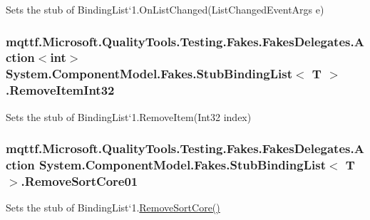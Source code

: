 Sets the stub of Binding\-List`1.On\-List\-Changed(\-List\-Changed\-Event\-Args e)

\hypertarget{class_system_1_1_component_model_1_1_fakes_1_1_stub_binding_list_3_01_t_01_4_a0ae4ea514a744ba36f4db9aa710d0f51}{
\subsubsection[{Remove\-Item\-Int32}]{\setlength{\rightskip}{0pt plus 5cm}mqttf.\-Microsoft.\-Quality\-Tools.\-Testing.\-Fakes.\-Fakes\-Delegates.\-Action$<$int$>$ System.\-Component\-Model.\-Fakes.\-Stub\-Binding\-List$<$ T $>$.Remove\-Item\-Int32}}\label{class_system_1_1_component_model_1_1_fakes_1_1_stub_binding_list_3_01_t_01_4_a0ae4ea514a744ba36f4db9aa710d0f51}


Sets the stub of Binding\-List`1.Remove\-Item(\-Int32 index)

\hypertarget{class_system_1_1_component_model_1_1_fakes_1_1_stub_binding_list_3_01_t_01_4_a65b7586153f60a39a54251416e7b1cf1}{
\subsubsection[{Remove\-Sort\-Core01}]{\setlength{\rightskip}{0pt plus 5cm}mqttf.\-Microsoft.\-Quality\-Tools.\-Testing.\-Fakes.\-Fakes\-Delegates.\-Action System.\-Component\-Model.\-Fakes.\-Stub\-Binding\-List$<$ T $>$.Remove\-Sort\-Core01}}\label{class_system_1_1_component_model_1_1_fakes_1_1_stub_binding_list_3_01_t_01_4_a65b7586153f60a39a54251416e7b1cf1}


Sets the stub of Binding\-List`1.\hyperlink{class_system_1_1_component_model_1_1_fakes_1_1_stub_binding_list_3_01_t_01_4_a95ed368665465469cde4d803739c355b}{Remove\-Sort\-Core()}

